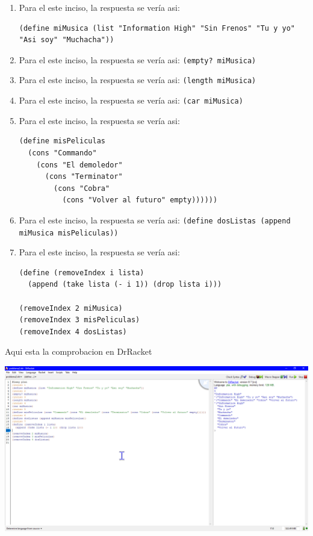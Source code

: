 \documentclass[answers]{exam}
\begin{document}
\begin{questions}
\begin{solution}
  \begin{enumerate}
    \item Para el este inciso, la respuesta se vería asi: 
    \begin{verbatim}
(define miMusica (list "Information High" "Sin Frenos" "Tu y yo" "Asi soy" "Muchacha"))
    \end{verbatim}
    \item Para el este inciso, la respuesta se vería asi: \verb|(empty? miMusica)|
    \item Para el este inciso, la respuesta se vería asi: \verb|(length miMusica)|
    \item Para el este inciso, la respuesta se vería asi: \verb|(car miMusica)|
    \item Para el este inciso, la respuesta se vería asi: 
    \begin{verbatim}
(define misPeliculas 
  (cons "Commando" 
    (cons "El demoledor" 
      (cons "Terminator" 
        (cons "Cobra" 
          (cons "Volver al futuro" empty))))))
    \end{verbatim} 
    \item Para el este inciso, la respuesta se vería asi: \verb|(define dosListas (append miMusica misPeliculas))|
    \item Para el este inciso, la respuesta se vería asi:
    \begin{verbatim}
(define (removeIndex i lista)
  (append (take lista (- i 1)) (drop lista i)))

(removeIndex 2 miMusica)
(removeIndex 3 misPeliculas)
(removeIndex 4 dosListas)
    \end{verbatim}
  \end{enumerate}
  Aqui esta la comprobacion en DrRacket
  \begin{center}
    \includegraphics[scale=.4]{images/2.png}
  \end{center}

\end{solution}
\end{questions}
\end{document}
